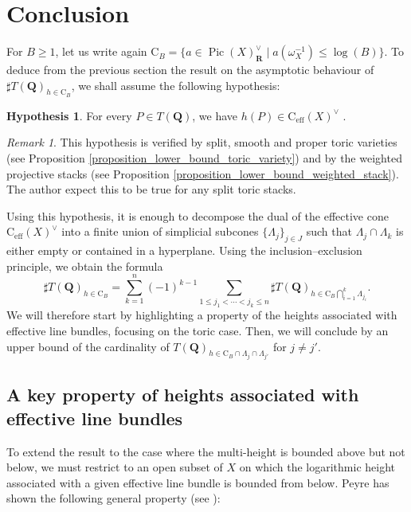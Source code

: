 \documentclass{proc-l}
\newcommand{\R}{\mathbf{R}}
\newcommand{\Q}{\mathbf{Q}}
\newcommand{\cone}{\text{C}_{\text{eff}}(X)}
\DeclareMathOperator{\Pic}{Pic}
\newcommand{\w}{\omega}
\theoremstyle{definition}
\newtheorem{hypothesis}[theorem]{Hypothesis}
\theoremstyle{remark}
\newtheorem{remark}[theorem]{Remark}
\numberwithin{equation}{section}
\begin{document}
\section{Conclusion}\label{section_conclusion}




For $B \geqslant 1$, let us write again $\mathrm{C}_B = \{ a \in \Pic(X)_{\R}^{\vee} \mid a(\w_{X}^{-1}) \leqslant \log(B) \}$. To deduce from the previous section the result on the asymptotic behaviour of
$\sharp T(\Q)_{h \in \mathrm{C}_B}$, we shall assume the following hypothesis:

\begin{hypothesis}\label{hypothesis_lower_bound_multi_height}
    For every $P \in T(\Q)$, we have $h(P) \in \cone^{\vee}$ .
\end{hypothesis}

\begin{remark}
    This hypothesis is verified by split, smooth and proper toric varieties (see Proposition \ref{proposition_lower_bound_toric_variety}) and by the weighted projective stacks (see Proposition \ref{proposition_lower_bound_weighted_stack}). The author expect this to be true for any split toric stacks.
\end{remark}

Using this hypothesis, it is enough to decompose the dual of the effective cone 
$\cone^{\vee}$ into a finite union of simplicial subcones $\{\Lambda_{j}\}_{j \in J}$ such that 
$\Lambda_j \cap \Lambda_k$ is either empty or contained in a hyperplane. Using the inclusion–exclusion 
principle, we obtain the formula
$$
\sharp T(\Q)_{h \in \mathrm{C}_B} 
= \sum_{k = 1}^n (-1)^{k-1} 
\sum_{1 \leqslant j_1 < \cdots < j_k \leqslant n}
\sharp T(\Q)_{h \in \mathrm{C}_B \bigcap_{i = 1}^k \Lambda_{j_i}}.
$$We will therefore start by highlighting a property of the heights associated with effective line bundles, 
focusing on the toric case. Then, we will conclude by an upper bound of the cardinality of 
$T(\Q)_{h \in \mathrm{C}_B \cap \Lambda_j \cap \Lambda_{j'}}$ for $j \neq j'$.


\subsection{A key property of heights associated with effective line bundles}




To extend the result to the case where the multi-height is bounded above but not below, we must restrict to an open subset of $X$ on which the logarithmic height associated with a given effective line bundle is bounded from below. Peyre has shown the following general property (see \cite[Lemma 4.5]{Peyre_beyond_height}):
\end{document}

